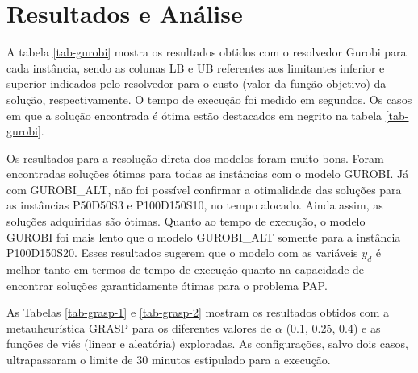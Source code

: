 \documentclass{MO824}
\begin{document}
        \begin{table}[ht]
            \centering
            \caption{Condições de Execução}
            \label{table:conditions}
            \vspace{0.3cm}
        \end{table}

\section{Resultados e Análise}

A tabela \ref{tab-gurobi} mostra os resultados obtidos com o resolvedor Gurobi para cada instância, sendo as colunas LB e UB referentes aos limitantes inferior e superior indicados pelo resolvedor para o custo (valor da função objetivo) da solução, respectivamente. O tempo de execução foi medido em segundos. Os casos em que a solução encontrada é ótima estão destacados em negrito na tabela \ref{tab-gurobi}. 

Os resultados para a resolução direta dos modelos foram muito bons. Foram encontradas soluções ótimas para todas as instâncias com o modelo GUROBI. Já com GUROBI\_ALT, não foi possível confirmar a otimalidade das soluções para as instâncias P50D50S3 e P100D150S10, no tempo alocado. Ainda assim, as soluções adquiridas são ótimas. Quanto ao tempo de execução, o modelo GUROBI foi mais lento que o modelo GUROBI\_ALT somente para a instância P100D150S20. Esses resultados sugerem que o modelo com as variáveis $y_d$ é melhor tanto em termos de tempo de execução quanto na capacidade de encontrar soluções garantidamente ótimas para o problema PAP.

As Tabelas \ref{tab-grasp-1} e \ref{tab-grasp-2} mostram os resultados obtidos com a metauheurística GRASP para os diferentes valores de $\alpha$ (0.1, 0.25, 0.4) e as funções de viés (linear e aleatória) exploradas. As configurações, salvo dois casos, ultrapassaram o limite de 30 minutos estipulado para a execução. 
\end{document}
